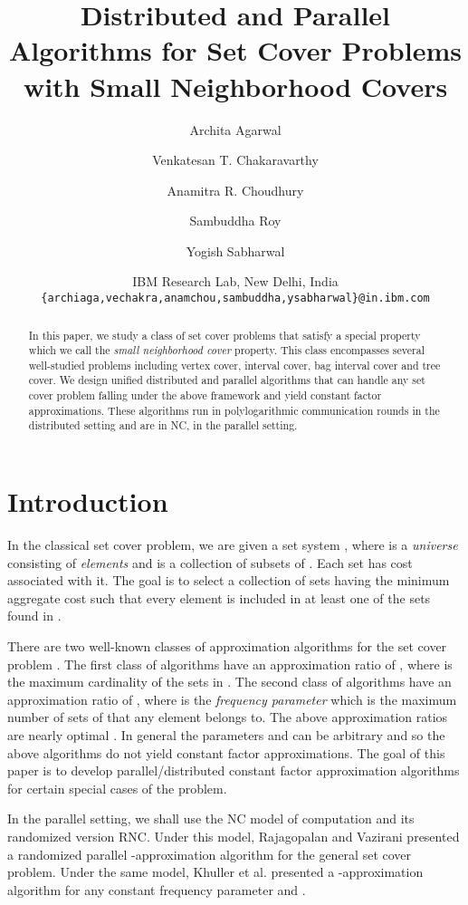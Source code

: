 \documentclass[11pt]{article}
\title{Distributed and Parallel Algorithms for Set Cover Problems with Small Neighborhood Covers}
\author{Archita Agarwal \and Venkatesan T. Chakaravarthy \and Anamitra R. Choudhury \and Sambuddha Roy \and Yogish Sabharwal}
\date{IBM Research Lab, New Delhi, India\\
  \texttt{\{archiaga,vechakra,anamchou,sambuddha,ysabharwal\}@in.ibm.com}
}
\begin{document}
\maketitle

\begin{abstract}
In this paper, we study a class of set cover problems that satisfy a special property which 
we call the {\em small neighborhood cover} property.
This class encompasses several well-studied problems including vertex cover, interval cover, 
bag interval cover and tree cover. We design unified distributed and parallel algorithms that can handle 
any set cover problem falling under the above framework and yield constant factor approximations.
These algorithms run in polylogarithmic communication rounds in the distributed setting
and are in NC, in the parallel setting.
\end{abstract}

\section{Introduction}
In the classical set cover problem, we are given a set system ,
where  is a {\em universe} consisting of  {\em elements}
and  is a collection of  subsets of .
Each set  has cost  associated with it.
The goal is to select a collection of sets 
having the minimum aggregate cost such that every element is included in at least one
of the sets found in .

There are two well-known classes of approximation algorithms for the set cover problem \cite{ShmoysBook}.
The first class of algorithms have an approximation ratio of ,
where  is the maximum cardinality of the sets in .
The second class of algorithms have an approximation ratio of ,
where  is the {\em frequency parameter} which is the maximum number of sets of 
that any element belongs to. 
The above approximation ratios are nearly optimal \cite{Hypergraph-Hardness, RazS97, Feige}. 
In general the parameters  and  can be arbitrary and so the above algorithms do not yield
constant factor approximations.
The goal of this paper is to develop parallel/distributed constant factor approximation algorithms
for certain special cases of the problem.

In the parallel setting, we shall use the NC model of computation and its randomized version RNC.
Under this model, Rajagopalan and Vazirani \cite{RV} presented a randomized 
parallel -approximation algorithm for the general set cover problem.
Under the same model, Khuller et al. \cite{KVY} presented a -approximation algorithm
for any constant frequency parameter  and .
\end{document}
